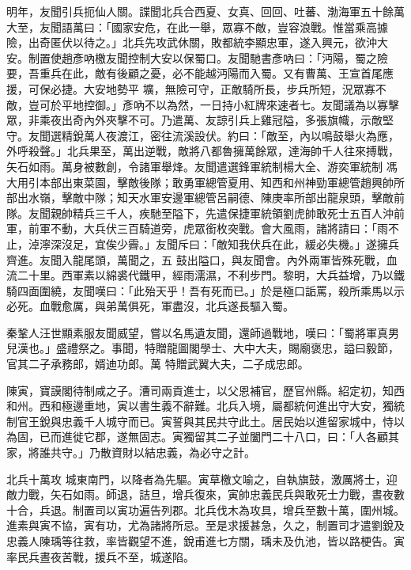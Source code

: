 \begin{pinyinscope}
 明年，友聞引兵扼仙人關。諜聞北兵合西夏、女真、回回、吐蕃、渤海軍五十餘萬大至，友聞語萬曰：「國家安危，在此一舉，眾寡不敵，豈容浪戰。惟當乘高據險，出奇匿伏以待之。」北兵先攻武休關，敗都統李顯忠軍，遂入興元，欲沖大安。制置使趙彥吶檄友聞控制大安以保蜀口。友聞馳書彥吶曰：「沔陽，蜀之險要，吾重兵在此，敵有後顧之憂，必不能越沔陽而入蜀。又有曹萬、王宣首尾應援，可保必捷。大安地勢平
 壙，無險可守，正敵騎所長，步兵所短，況眾寡不敵，豈可於平地控御。」彥吶不以為然，一日持小紅牌來速者七。友聞議為以寡擊眾，非乘夜出奇內外夾擊不可。乃遣萬、友諒引兵上雞冠隘，多張旗幟，示敵堅守。友聞選精銳萬人夜渡江，密往流溪設伏。約曰：「敵至，內以鳴鼓舉火為應，外呼殺聲。」北兵果至，萬出逆戰，敵將八都魯擁萬餘眾，達海帥千人往來搏戰，矢石如雨。萬身被數創，令諸軍舉烽。友聞遣選鋒軍統制楊大全、游奕軍統制
 馮大用引本部出東菜園，擊敵後隊；敢勇軍總管夏用、知西和州神勁軍總管趙興帥所部出水嶺，擊敵中隊；知天水軍安邊軍總管呂嗣德、陳庚率所部出龍泉頭，擊敵前隊。友聞親帥精兵三千人，疾馳至隘下，先遣保捷軍統領劉虎帥敢死士五百人沖前軍，前軍不動，大兵伏三百騎道旁，虎眾銜枚突戰。會大風雨，諸將請曰：「雨不止，淖濘深沒足，宜俟少霽。」友聞斥曰：「敵知我伏兵在此，緩必失機。」遂擁兵齊進。友聞入龍尾頭，萬聞之，五
 鼓出隘口，與友聞會。內外兩軍皆殊死戰，血流二十里。西軍素以綿裘代鐵甲，經雨濡濕，不利步門。黎明，大兵益增，乃以鐵騎四面圍繞，友聞嘆曰：「此殆天乎！吾有死而已。」於是極口詬罵，殺所乘馬以示必死。血戰愈厲，與弟萬俱死，軍盡沒，北兵遂長驅入蜀。



 秦鞏人汪世顯素服友聞威望，嘗以名馬遺友聞，還師過戰地，嘆曰：「蜀將軍真男兒漢也。」盛禮祭之。事聞，特贈龍圖閣學士、大中大夫，賜廟褒忠，謚曰毅節，官其二子承務郎，婿迪功郎。萬
 特贈武翼大夫，二子成忠郎。



 陳寅，寶謨閣待制咸之子。漕司兩貢進士，以父恩補官，歷官州縣。紹定初，知西和州。西和極邊重地，寅以書生義不辭難。北兵入境，屬都統何進出守大安，獨統制官王銳與忠義千人城守而已。寅誓與其民共守此土。居民始以進留家城中，恃以為固，已而進徙它郡，遂無固志。寅獨留其二子並闔門二十八口，曰：「人各顧其家，將誰共守。」乃散資財以結忠義，為必守之計。



 北兵十萬攻
 城東南門，以降者為先驅。寅草檄文喻之，自執旗鼓，激厲將士，迎敵力戰，矢石如雨。師退，詰旦，增兵復來，寅帥忠義民兵與敢死士力戰，晝夜數十合，兵退。制置司以寅功遍告列郡。北兵伐木為攻具，增兵至數十萬，圍州城。進素與寅不協，寅有功，尤為諸將所忌。至是求援甚急，久之，制置司才遣劉銳及忠義人陳瑀等往救，率皆觀望不進，銳甫進七方關，瑀未及仇池，皆以路梗告。寅率民兵晝夜苦戰，援兵不至，城遂陷。




\end{pinyinscope}
